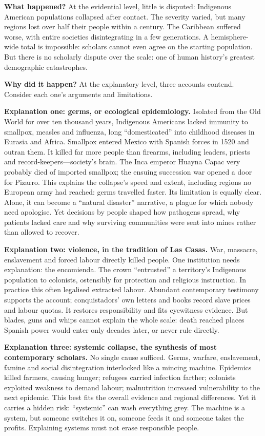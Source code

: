 \textbf{What happened?} At the evidential level, little is disputed: Indigenous American populations collapsed after contact. The severity varied, but many regions lost over half their people within a century. The Caribbean suffered worse, with entire societies disintegrating in a few generations. A hemisphere-wide total is impossible: scholars cannot even agree on the starting population. But there is no scholarly dispute over the scale: one of human history's greatest demographic catastrophes.

\textbf{Why did it happen?} At the explanatory level, three accounts contend. Consider each one's arguments and limitations.

\textbf{Explanation one: germs, or ecological epidemiology.} Isolated from the Old World for over ten thousand years, Indigenous Americans lacked immunity to smallpox, measles and influenza, long ``domesticated'' into childhood diseases in Eurasia and Africa. Smallpox entered Mexico with Spanish forces in 1520 and outran them. It killed far more people than firearms, including leaders, priests and record-keepers---society's brain. The Inca emperor Huayna Capac very probably died of imported smallpox; the ensuing succession war opened a door for Pizarro. This explains the collapse's speed and extent, including regions no European army had reached: germs travelled faster. Its limitation is equally clear. Alone, it can become a ``natural disaster'' narrative, a plague for which nobody need apologise. Yet decisions by people shaped how pathogens spread, why patients lacked care and why surviving communities were sent into mines rather than allowed to recover.

\textbf{Explanation two: violence, in the tradition of Las Casas.} War, massacre, enslavement and forced labour directly killed people. One institution needs explanation: the encomienda. The crown ``entrusted'' a territory's Indigenous population to colonists, ostensibly for protection and religious instruction. In practice this often legalised extracted labour. Abundant contemporary testimony supports the account; conquistadors' own letters and books record slave prices and labour quotas. It restores responsibility and fits eyewitness evidence. But blades, guns and whips cannot explain the whole scale: death reached places Spanish power would enter only decades later, or never rule directly.

\textbf{Explanation three: systemic collapse, the synthesis of most contemporary scholars.} No single cause sufficed. Germs, warfare, enslavement, famine and social disintegration interlocked like a mincing machine. Epidemics killed farmers, causing hunger; refugees carried infection farther; colonists exploited weakness to demand labour; malnutrition increased vulnerability to the next epidemic. This best fits the overall evidence and regional differences. Yet it carries a hidden risk: ``systemic'' can wash everything grey. The machine is a system, but someone switches it on, someone feeds it and someone takes the profits. Explaining systems must not erase responsible people.

